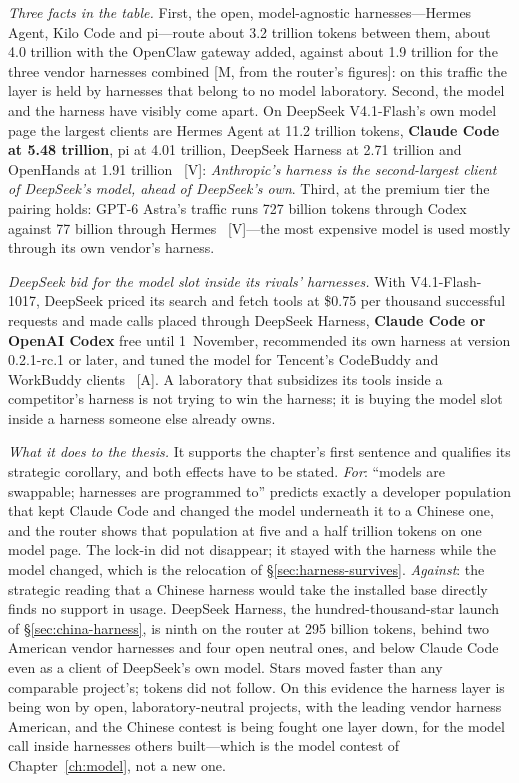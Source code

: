 \emph{Three facts in the table.} First, the open, model-agnostic harnesses---Hermes Agent, Kilo Code and pi---route about 3.2 trillion tokens between them, about 4.0 trillion with the OpenClaw gateway added, against about 1.9 trillion for the three vendor harnesses combined [M, from the router's figures]: on this traffic the layer is held by harnesses that belong to no model laboratory. Second, the model and the harness have visibly come apart. On DeepSeek V4.1-Flash's own model page the largest clients are Hermes Agent at 11.2 trillion tokens, \textbf{Claude Code at 5.48 trillion}, pi at 4.01 trillion, DeepSeek Harness at 2.71 trillion and OpenHands at 1.91 trillion~\cite{mdl-openrouter-apps} [V]: \emph{Anthropic's harness is the second-largest client of DeepSeek's model, ahead of DeepSeek's own}. Third, at the premium tier the pairing holds: GPT-6 Astra's traffic runs 727 billion tokens through Codex against 77 billion through Hermes~\cite{mdl-openrouter-apps} [V]---the most expensive model is used mostly through its own vendor's harness.

\emph{DeepSeek bid for the model slot inside its rivals' harnesses.} With V4.1-Flash-1017, DeepSeek priced its search and fetch tools at \$0.75 per thousand successful requests and made calls placed through DeepSeek Harness, \textbf{Claude Code or OpenAI Codex} free until 1~November, recommended its own harness at version 0.2.1-rc.1 or later, and tuned the model for Tencent's CodeBuddy and WorkBuddy clients~\cite{mdl-v41flash-1017} [A]. A laboratory that subsidizes its tools inside a competitor's harness is not trying to win the harness; it is buying the model slot inside a harness someone else already owns.

\emph{What it does to the thesis.} It supports the chapter's first sentence and qualifies its strategic corollary, and both effects have to be stated. \emph{For}: ``models are swappable; harnesses are programmed to'' predicts exactly a developer population that kept Claude Code and changed the model underneath it to a Chinese one, and the router shows that population at five and a half trillion tokens on one model page. The lock-in did not disappear; it stayed with the harness while the model changed, which is the relocation of \S\ref{sec:harness-survives}. \emph{Against}: the strategic reading that a Chinese harness would take the installed base directly finds no support in usage. DeepSeek Harness, the hundred-thousand-star launch of \S\ref{sec:china-harness}, is ninth on the router at 295 billion tokens, behind two American vendor harnesses and four open neutral ones, and below Claude Code even as a client of DeepSeek's own model. Stars moved faster than any comparable project's; tokens did not follow. On this evidence the harness layer is being won by open, laboratory-neutral projects, with the leading vendor harness American, and the Chinese contest is being fought one layer down, for the model call inside harnesses others built---which is the model contest of Chapter~\ref{ch:model}, not a new one.

